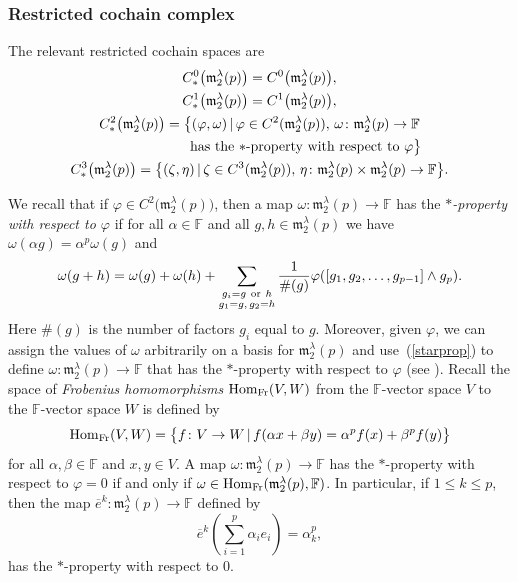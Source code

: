 \documentclass[10pt,a4paper]{amsart}
\def\Hom{\operatorname{Hom}}
\def\phi{\varphi}
\def\m{\mathfrak m}
\def\F{\mathbb F}
\numberwithin{equation}{section}
\begin{document}
\subsubsection{Restricted cochain complex}

The relevant restricted cochain spaces are
\begin{gather*}
 C^0_*\big(\m_2^\lambda(p)\big)= C^0\big(\m_2^\lambda(p)\big),\\
 C^1_*\big(\m_2^\lambda(p)\big)= C^1\big(\m_2^\lambda(p)\big),\\
 C^2_*\big(\m_2^\lambda(p)\big)=\big\{(\phi,\omega)\, |\, \phi\in C^2(\m_2^\lambda(p)),\, \omega\colon \m_2^\lambda(p)\to\F\\
\hphantom{C^2_*\big(\m_2^\lambda(p)\big)=\big\{}{} \text{\rm has the $*$-property with respect to $\phi$}\big\}\\
 C^3_*\big(\m_2^\lambda(p)\big)=\big\{(\zeta,\eta)\, |\, \zeta\in C^3(\m_2^\lambda(p)),\, \eta\colon \m_2^\lambda(p)\times\m_2^\lambda(p)\to\F \big\}.
\end{gather*}

We recall that if $\phi\in C^2\big(\m_2^\lambda(p)\big)$, then a map $\omega\colon \m_2^\lambda(p)\to\F$ has the {\it $*$-property with respect to $\phi$} if for all $\alpha\in\F$ and all $g,h\in \m_2^\lambda(p)$ we have $\omega(\alpha g)=\alpha^p\omega(g)$ and
\begin{gather} \label{starprop}
 \omega (g+h)=\omega (g)+ \omega (h) + \sum_{\substack{g_i=g\ {\rm or}\ h\\ g_1=g,\, g_2=h}} \frac{1}{\#(g)} \phi([g_1,g_2,\dots, g_{p-1}]\wedge g_p).
\end{gather} Here $\#(g)$ is the number of factors $g_i$ equal to $g$. Moreover, given $\phi$, we can assign the values of $\omega$ arbitrarily on a basis for $\m_2^\lambda(p)$ and use~(\ref{starprop}) to define $\omega\colon \m_2^\lambda(p)\to\F$ that has the $*$-property with respect to $\phi$ (see \cite[pp.~249--250]{EvFi2019}). Recall the space of {\it Frobenius homomorphisms} $\Hom_{\rm Fr}(V,W)$ from the $\F$-vector space $V$ to the $\F$-vector space $W$ is defined by
\[ \Hom_{\rm Fr}(V,W) = \big\{ f\colon V\to W\, |\, f(\alpha x+ \beta y) = \alpha^p f(x) + \beta^p f(y)\big\}\] for all $\alpha,\beta\in\F$ and
$x,y\in V$. A map $\omega\colon \m_2^\lambda(p)\to\F$ has the $*$-property with respect to $\phi=0$ if and only if $\omega\in\Hom_{\rm Fr}(\m_2^\lambda(p),\F)$. In particular, if
$1\le k\le p$, then the map $\overline e^k\colon \m_2^\lambda(p)\to\F$ defined by
\[\overline e^k\left (\sum_{i=1}^p \alpha_ie_i\right ) = \alpha_k^p,\]
has the $*$-property with respect to $0$.
\end{document}
